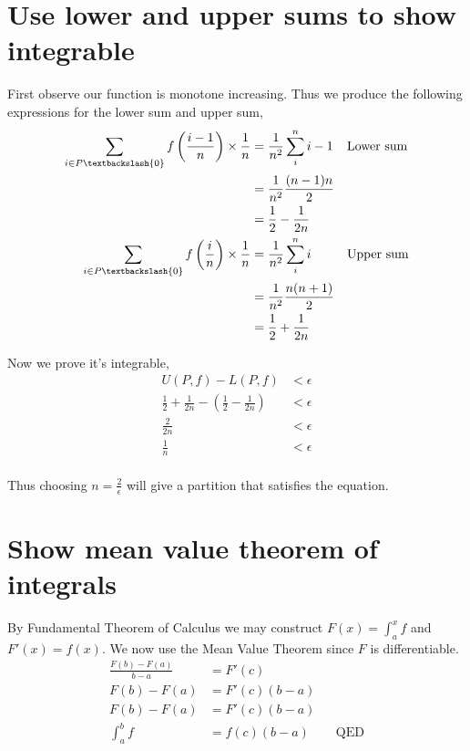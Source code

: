 \documentclass{article}
\begin{document}
\section{Use lower and upper sums to show integrable}
First observe our function is monotone increasing.
Thus we produce the following expressions for the lower sum and upper sum,
\begin{align*}
    \sum_{i \in P \textbackslash \{0\}} f\left(\frac{i - 1}{n}\right) \times \frac{1}{n}
    &= \frac{1}{n^2} \sum_i^n i-1 && \text{Lower sum} \\
    &= \frac{1}{n^2} \frac{(n-1)n}{2} \\
    &= \frac{1}{2} - \frac{1}{2n} \\
    \sum_{i \in P \textbackslash \{0\}} f\left(\frac{i}{n}\right) \times \frac{1}{n}
    &= \frac{1}{n^2} \sum_i^n i && \text{Upper sum} \\
    &= \frac{1}{n^2} \frac{n(n+1)}{2} \\
    &= \frac{1}{2} + \frac{1}{2n} \\
\end{align*}

Now we prove it's integrable,
\begin{align*}
    U(P,f) - L(P,f) &< \epsilon \\
    \frac{1}{2} + \frac{1}{2n} - \left(\frac{1}{2} - \frac{1}{2n}\right)
    &< \epsilon \\
    \frac{2}{2n} &< \epsilon \\
    \frac{1}{n} &< \epsilon \\
\end{align*}

Thus choosing $n = \frac{2}{\epsilon}$ will give a partition that satisfies
the equation.

\section{Show mean value theorem of integrals}
By Fundamental Theorem of Calculus we may construct $F(x) = \int_a^x f$ and
$F'(x) = f(x)$. We now use the Mean Value Theorem since $F$ is differentiable.
\begin{align*}
    \frac{F(b) - F(a)}{b - a} &= F'(c) \\
    F(b) - F(a) &= F'(c)(b - a) \\
    F(b) - F(a) &= F'(c)(b - a) \\
    \int_a^b f &= f(c)(b - a) && \text{QED}
\end{align*}
\end{document}
